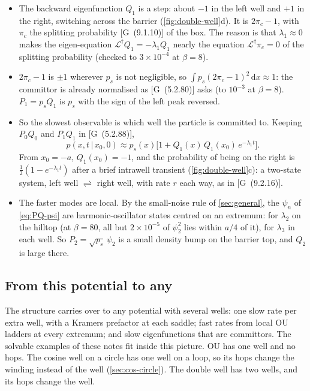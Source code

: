 \documentclass[11pt]{article}
\numberwithin{equation}{section}
\newcommand{\dd}{\mathrm{d}}
\newcommand{\given}{\,|\,}
\newcommand{\G}[1]{[G~(#1)]}
\begin{document}
\begin{itemize}
  \item The backward eigenfunction $Q_1$ is a step: about $-1$ in the left well and $+1$ in the right, switching
        across the barrier (\cref{fig:double-well}d). It is $2\pi_c-1$, with $\pi_c$ the splitting probability
        \G{9.1.10} of the box. The reason is that $\lambda_1\approx0$ makes the eigen-equation
        $\mathcal L^\dagger Q_1=-\lambda_1Q_1$ nearly the equation $\mathcal L^\dagger\pi_c=0$ of the splitting
        probability (checked to $3\times10^{-4}$ at $\beta=8$).
  \item $2\pi_c-1$ is $\pm1$ wherever $p_s$ is not negligible, so $\int p_s(2\pi_c-1)^2\,\dd x\approx1$: the committor is
        already normalised as \G{5.2.80} asks (to $10^{-3}$ at $\beta=8$). $P_1=p_sQ_1$ is $p_s$ with the sign of the
        left peak reversed.
  \item So the slowest observable is which well the particle is committed to. Keeping $P_0Q_0$ and $P_1Q_1$ in
        \G{5.2.88},
        \begin{equation*}
          p(x,t\given x_0,0)\approx p_s(x)\bigl[1+Q_1(x)\,Q_1(x_0)\,e^{-\lambda_1t}\bigr].
        \end{equation*}
        From $x_0=-a$, $Q_1(x_0)=-1$, and the probability of being on the right is $\tfrac12(1-e^{-\lambda_1t})$ after a
        brief intrawell transient (\cref{fig:double-well}c): a two-state system, left well $\rightleftharpoons$ right well,
        with rate $r$ each way, as in \G{9.2.16}.
  \item The faster modes are local. By the small-noise rule of \cref{sec:general}, the $\psi_n$ of
        \cref{eq:PQ-psi} are harmonic-oscillator states centred on an extremum: for $\lambda_2$ on the hilltop (at
        $\beta=80$, all but $2\times10^{-5}$ of $\psi_2^2$ lies within $a/4$ of it), for $\lambda_3$ in each well. So
        $P_2=\sqrt{p_s}\,\psi_2$ is a small density bump on the barrier top, and $Q_2$ is large there.
\end{itemize}

\subsection{From this potential to any}

The structure carries over to any potential with several wells: one slow rate per extra well, with a Kramers
prefactor at each saddle; fast rates from local OU ladders at every extremum; and slow eigenfunctions that are
committors. The solvable examples of these notes fit inside this picture. OU has one well and no hops. The cosine
well on a circle has one well on a loop, so its hops change the winding instead of the well
(\cref{sec:cos-circle}). The double well has two wells, and its hops change the well.
\end{document}
